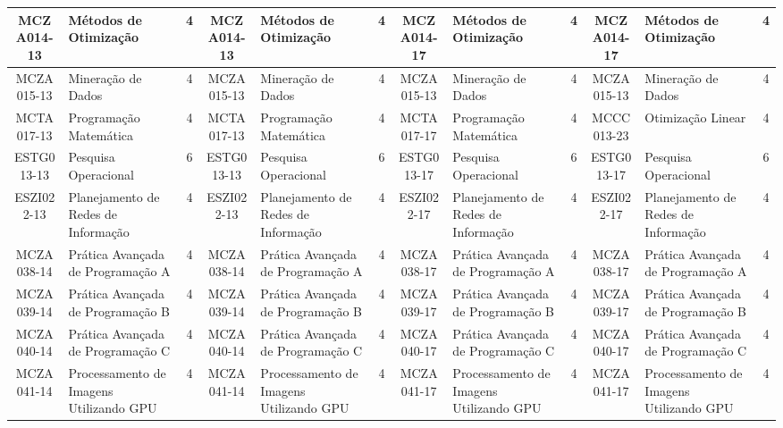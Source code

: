 \documentclass[a4paper]{article}
\begin{document}
\begin{landscape}
{\begin{longtable}{|c|p{.2\textheight}|c||c|p{.2\textheight}|c||c|p{.2\textheight}|c||c|p{.2\textheight}|c|}
MCZA014-13 & Métodos de Otimização & 4 &
MCZA014-13 & Métodos de Otimização & 4 &
MCZA014-17 & Métodos de Otimização & 4 &
MCZA014-17 & Métodos de Otimização & 4 \\ \hline

MCZA015-13 & Mineração de Dados & 4 &
MCZA015-13 & Mineração de Dados & 4 &
MCZA015-13 & Mineração de Dados & 4 &
MCZA015-13 & Mineração de Dados & 4\\ \hline

MCTA017-13 & Programação Matemática & 4 &
MCTA017-13 & Programação Matemática & 4 &
MCTA017-17 & Programação Matemática & 4 &
MCCC013-23 & Otimização Linear & 4 \\ \hline



ESTG013-13 & Pesquisa Operacional & 6 &
ESTG013-13 & Pesquisa Operacional & 6 &
ESTG013-17 & Pesquisa Operacional & 6 &
ESTG013-17 & Pesquisa Operacional & 6\\ \hline

ESZI022-13 & Planejamento de Redes de Informação & 4 &
ESZI022-13 & Planejamento de Redes de Informação & 4 &
ESZI022-17 & Planejamento de Redes de Informação & 4 &
ESZI022-17 & Planejamento de Redes de Informação & 4\\ \hline

MCZA038-14 & Prática Avançada de Programação A & 4 &
MCZA038-14 & Prática Avançada de Programação A & 4 &
MCZA038-17 & Prática Avançada de Programação A & 4 &
MCZA038-17 & Prática Avançada de Programação A & 4\\ \hline

MCZA039-14 & Prática Avançada de Programação B & 4 &
MCZA039-14 & Prática Avançada de Programação B & 4 &
MCZA039-17 & Prática Avançada de Programação B & 4 & 
MCZA039-17 & Prática Avançada de Programação B & 4\\ \hline

MCZA040-14 & Prática Avançada de Programação C & 4 &
MCZA040-14 & Prática Avançada de Programação C & 4 &
MCZA040-17 & Prática Avançada de Programação C & 4 &
MCZA040-17 & Prática Avançada de Programação C & 4\\ \hline

MCZA041-14 & Processamento de Imagens Utilizando GPU & 4 &
MCZA041-14 & Processamento de Imagens Utilizando GPU & 4 &
MCZA041-17 & Processamento de Imagens Utilizando GPU & 4 & 
MCZA041-17 & Processamento de Imagens Utilizando GPU & 4\\ \hline


\end{longtable}}
\end{landscape}
\end{document}
